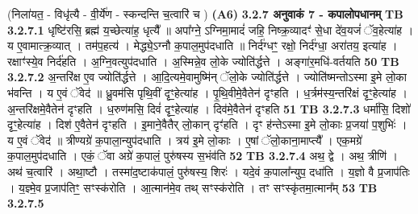 \documentclass[17pt]{extarticle}
\begin{document}
{{{{{{{{{{{{{{{{{{{                  \newline
                                    (निला॑यत॒ - विधृ॑त्यै - वी॒र्ये॑ण - स्कन्दन्ति च॒त्वारि॑ च ) \textbf{(A6)} \newline \newline
                \textbf{ 3.2.7     अनुवाकं   7 - कपालोपधानम्} \newline
                                \textbf{ TB 3.2.7.1} \newline
                  धृष्टि॑रसि॒ ब्रह्म॑ य॒च्छेत्या॑ह॒ धृत्यै᳚ ॥ अपा᳚ग्ने॒ ऽग्निमा॒मादं॑ जहि॒ निष्क्र॒व्यादꣳ॑ से॒धा दे॑व॒यजं॑ ॅव॒हेत्या॑ह । य ए॒वामात्क्र॒व्यात् । तम॑प॒हत्य॑ । मेद्ध्ये॒ऽग्नौ क॒पाल॒मुप॑दधाति ॥ निर्द॑ग्धꣳ॒॒ रक्षो॒ निर्द॑ग्धा॒ अरा॑तय॒ इत्या॑ह । रक्षाꣳ॑स्ये॒व निर्द॑हति । अ॒ग्नि॒वत्युप॑दधाति । अ॒स्मिन्ने॒व लो॒के ज्योति॑र्द्धत्ते । अङ्गा॑र॒मधि॑-वर्तयति \textbf{ 50} \newline
                  \newline
                                \textbf{ TB 3.2.7.2} \newline
                  अ॒न्तरि॑क्ष ए॒व ज्योति॑र्द्धत्ते । आ॒दि॒त्यमे॒वामुष्मि॑न् ॅलो॒के ज्योति॑र्द्धत्ते । ज्योति॑ष्मन्तोऽस्मा इ॒मे लो॒का भ॑वन्ति । य ए॒वं ॅवेद॑ ॥ ध्रु॒वम॑सि पृथि॒वीं दृꣳ॒॒हेत्या॑ह । पृ॒थि॒वीमे॒वैतेन॑ दृꣳहति । ध॒र्त्रम॑स्य॒न्तरि॑क्षं दृꣳ॒॒हेत्या॑ह । अ॒न्तरि॑क्षमे॒वैतेन॑ दृꣳहति । ध॒रुण॑मसि॒ दिवं॑ दृꣳ॒॒हेत्या॑ह । दिव॑मे॒वैतेन॑ दृꣳहति \textbf{ 51} \newline
                  \newline
                                \textbf{ TB 3.2.7.3} \newline
                  धर्मा॑सि॒ दिशो॑ दृꣳ॒॒हेत्या॑ह । दिश॑ ए॒वैतेन॑ दृꣳहति । इ॒माने॒वैतैर् लो॒कान् दृꣳ॑हति । दृꣳ ह॑न्तेऽस्मा इ॒मे लो॒काः प्र॒जया॑ प॒शुभिः॑ । य ए॒वं ॅवेद॑ ॥ त्रीण्यग्रे॑ क॒पाला॒न्युप॑दधाति । त्रय॑ इ॒मे लो॒काः । ए॒षां ॅलो॒काना॒माप्त्यै᳚ । एक॒मग्रे॑ क॒पाल॒मुप॑दधाति । एकं॒ ॅवा अग्रे॑ क॒पालं॒ पुरु॑षस्य स॒भंव॑ति \textbf{ 52} \newline
                  \newline
                                \textbf{ TB 3.2.7.4} \newline
                  अथ॒ द्वे । अथ॒ त्रीणि॑ । अथ॑ च॒त्वारि॑ । अथा॒ष्टौ । तस्मा॑द॒ष्टाक॑पालं॒ पुरु॑षस्य॒ शिरः॑ । यदे॒वं क॒पाला᳚न्युप॒ दधा॑ति । य॒ज्ञो वै प्र॒जाप॑तिः । य॒ज्ञ्मे॒व प्र॒जाप॑तिꣳ॒॒ सꣳस्क॑रोति । आ॒त्मान॑मे॒व तथ् सꣳस्क॑रोति । तꣳ सꣳस्कृ॑तमा॒त्मान᳚म् \textbf{ 53} \newline
                  \newline
                                \textbf{ TB 3.2.7.5} \newline
}}}}}}}}}}}}}}}}}}}
\end{document}
